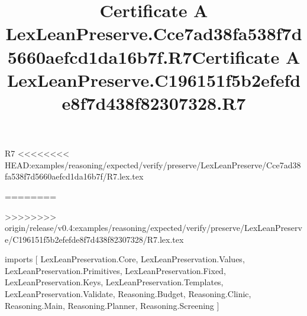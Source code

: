 \begin{lexlean}{R7}
<<<<<<<< HEAD:examples/reasoning/expected/verify/preserve/LexLeanPreserve/Cce7ad38fa538f7d5660aefcd1da16b7f/R7.lex.tex
\title{Certificate A LexLeanPreserve.Cce7ad38fa538f7d5660aefcd1da16b7f.R7}
========
\title{Certificate A LexLeanPreserve.C196151f5b2efefde8f7d438f82307328.R7}
>>>>>>>> origin/release/v0.4:examples/reasoning/expected/verify/preserve/LexLeanPreserve/C196151f5b2efefde8f7d438f82307328/R7.lex.tex
\begin{coremodule}
imports [
  LexLeanPreservation.Core,
  LexLeanPreservation.Values,
  LexLeanPreservation.Primitives,
  LexLeanPreservation.Fixed,
  LexLeanPreservation.Keys,
  LexLeanPreservation.Templates,
  LexLeanPreservation.Validate,
  Reasoning.Budget,
  Reasoning.Clinic,
  Reasoning.Main,
  Reasoning.Planner,
  Reasoning.Screening
]


\end{coremodule}
\end{lexlean}
